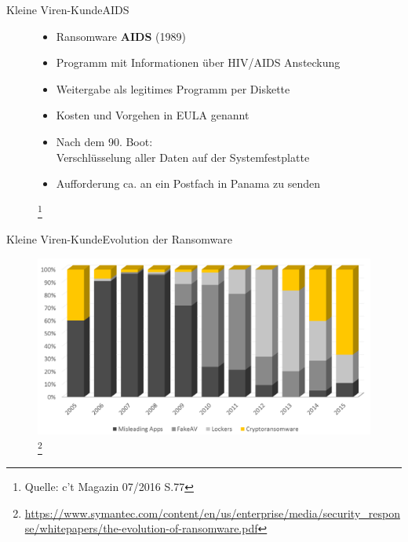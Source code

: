 \documentclass[10pt]{beamer}
\begin{document}
\begin{frame}{Kleine Viren-Kunde}{AIDS}
	\begin{figure}[p]
		\begin{itemize}
			\item Ransomware \textbf{AIDS} (1989)
			\item Programm mit Informationen über HIV/AIDS Ansteckung
			\item Weitergabe als legitimes Programm per Diskette \pause
			\item Kosten und Vorgehen in EULA genannt
			\item Nach dem 90. Boot: \\ Verschlüsselung aller Daten auf der Systemfestplatte
			\item Aufforderung ca.  an ein Postfach in Panama zu senden
		\end{itemize}
		\let\thefootnote\relax\footnote{Quelle: c't Magazin 07/2016 S.77}
	\end{figure}
\end{frame}


\begin{frame}{Kleine Viren-Kunde}{Evolution der Ransomware}
	\begin{figure}[p]
		\centering
		\includegraphics[scale=0.28]{ransom-evolution.png}
		\let\thefootnote\relax\footnote{\url{https://www.symantec.com/content/en/us/enterprise/media/security\_response/whitepapers/the-evolution-of-ransomware.pdf}}
	\end{figure}
\end{frame}
\end{document}
